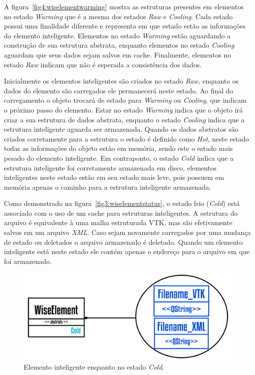 \documentclass[a4paper,12pt]{monografia}
\theoremstyle{plain}
\theoremstyle{definition}
\theoremstyle{remark}
\begin{document}
A figura~\ref{fig4:wiselementwarming} mostra as estruturas presentes em elementos no estado \textit{Warming} que é a mesma dos estados \textit{Raw} e \textit{Cooling}. Cada estado possui uma finalidade diferente e representa em que estado estão as informações do elemento inteligente. Elementos no estado \textit{Warming} estão aguardando a construção de sua estrutura abstrata, enquanto elementos  no estado \textit{Cooling} aguardam que seus dados sejam salvos em cache. Finalmente, elementos no estado \textit{Raw} indicam que não é esperada a consistência dos dados.

Inicialmente os elementos inteligentes são criados no estado \textit{Raw}, enquanto os dados do elemento são carregados ele permanecerá neste estado. Ao final do carregamento o objeto trocará de estado para \textit{Warming} ou \textit{Cooling}, que indicam o próximo passo do elemento. Estar no estado \textit{Warming} indica que o objeto irá criar a sua estrutura de dados abstrata, enquanto o estado \textit{Cooling} indica que a estrutura inteligente aguarda ser armazenada. Quando os dados abstratos são criados corretamente para a estrutura o estado é definido como \textit{Hot}, neste estado todas as informações do objeto estão em memória, sendo este o estado mais pesado do elemento inteligente. Em contraponto, o estado \textit{Cold} indica que a estrutura inteligente foi corretamente armazenada em disco, elementos inteligentes neste estado estão em seu estado mais leve, pois possuem em memória apenas o caminho para a estrutura inteligente armazenada.

Como demonstrado na figura~\ref{fig3:wiselementstatus}, o estado frio (\textit{Cold}) está associado com o uso de um cache para estruturas inteligentes. A estrutura do arquivo é equivalente à uma malha estruturada VTK, mas são efetivamente salvos em um arquivo \textit{XML}. Caso sejam novamente carregados por uma mudança de estado ou deletados o arquivo armazenado é deletado. Quando um elemento inteligente está neste estado ele contém apenas o endereço para o arquivo em que foi armazenado.

\begin{figure}[!htbp]
	\centering
	\includegraphics[scale=1.85]{Figures/WiseElementCold@16x.png}
	\caption{Elemento inteligente enquanto no estado \textit{Cold}.}
	\label{fig5:wiselementcold}
\end{figure}
\end{document}
